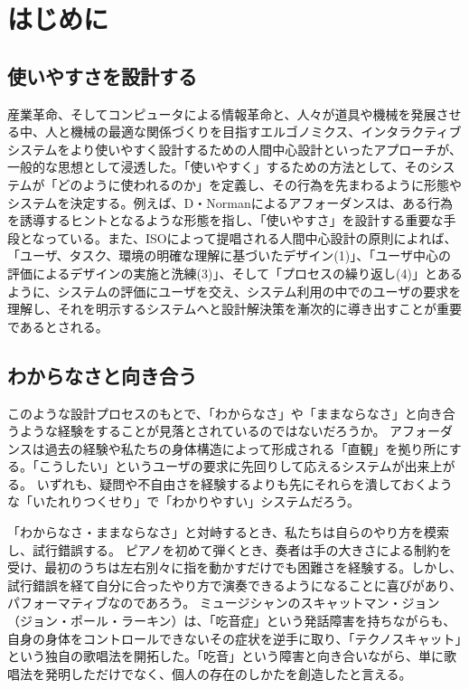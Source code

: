 \chapter{はじめに}
\label{introduction}

\section*{使いやすさを設計する}
産業革命、そしてコンピュータによる情報革命と、人々が道具や機械を発展させる中、人と機械の最適な関係づくりを目指すエルゴノミクス、インタラクティブシステムをより使いやすく設計するための人間中心設計といったアプローチが、一般的な思想として浸透した。「使いやすく」するための方法として、そのシステムが「どのように使われるのか」を定義し、その行為を先まわるように形態やシステムを決定する。例えば、D・Normanによるアフォーダンスは、ある行為を誘導するヒントとなるような形態を指し、「使いやすさ」を設計する重要な手段となっている。また、ISOによって提唱される人間中心設計の原則\cite{hcd}によれば、「ユーザ、タスク、環境の明確な理解に基づいたデザイン(1)」、「ユーザ中心の評価によるデザインの実施と洗練(3)」、そして「プロセスの繰り返し(4)」とあるように、システムの評価にユーザを交え、システム利用の中でのユーザの要求を理解し、それを明示するシステムへと設計解決策を漸次的に導き出すことが重要であるとされる。


\section*{わからなさと向き合う}
このような設計プロセスのもとで、「わからなさ」や「ままならなさ」と向き合うような経験をすることが見落とされているのではないだろうか。
アフォーダンスは過去の経験や私たちの身体構造によって形成される「直観」を拠り所にする。「こうしたい」というユーザの要求に先回りして応えるシステムが出来上がる。
いずれも、疑問や不自由さを経験するよりも先にそれらを潰しておくような「いたれりつくせり」で「わかりやすい」システムだろう。

「わからなさ・ままならなさ」と対峙するとき、私たちは自らのやり方を模索し、試行錯誤する。
ピアノを初めて弾くとき、奏者は手の大きさによる制約を受け、最初のうちは左右別々に指を動かすだけでも困難さを経験する。しかし、試行錯誤を経て自分に合ったやり方で演奏できるようになることに喜びがあり、パフォーマティブなのであろう。
ミュージシャンのスキャットマン・ジョン（ジョン・ポール・ラーキン）は、「吃音症」という発話障害を持ちながらも、自身の身体をコントロールできないその症状を逆手に取り、「テクノスキャット」という独自の歌唱法を開拓した。「吃音」という障害と向き合いながら、単に歌唱法を発明しただけでなく、個人の存在のしかたを創造したと言える。

